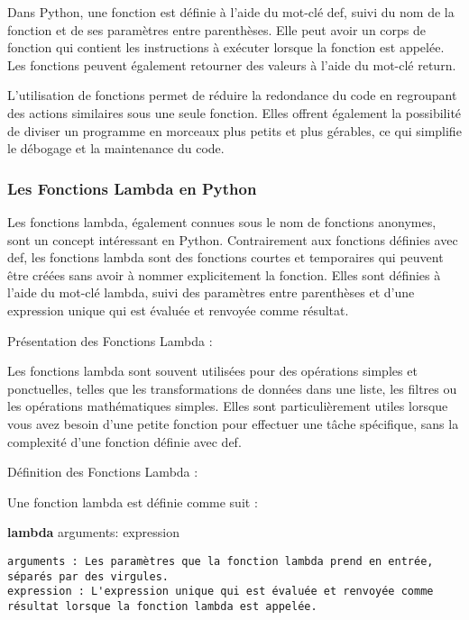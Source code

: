 \documentclass[11pt]{article}
\newenvironment{Shaded}{}{}
\newcommand{\KeywordTok}[1]{\textcolor[rgb]{0.00,0.44,0.13}{\textbf{{#1}}}}
\newcommand{\NormalTok}[1]{{#1}}
\begin{document}
Dans Python, une fonction est définie à l'aide du mot-clé def, suivi du
nom de la fonction et de ses paramètres entre parenthèses. Elle peut
avoir un corps de fonction qui contient les instructions à exécuter
lorsque la fonction est appelée. Les fonctions peuvent également
retourner des valeurs à l'aide du mot-clé return.

L'utilisation de fonctions permet de réduire la redondance du code en
regroupant des actions similaires sous une seule fonction. Elles offrent
également la possibilité de diviser un programme en morceaux plus petits
et plus gérables, ce qui simplifie le débogage et la maintenance du
code.

\hypertarget{les-fonctions-lambda-en-python}{%
\subsubsection{Les Fonctions Lambda en
Python}\label{les-fonctions-lambda-en-python}}

Les fonctions lambda, également connues sous le nom de fonctions
anonymes, sont un concept intéressant en Python. Contrairement aux
fonctions définies avec def, les fonctions lambda sont des fonctions
courtes et temporaires qui peuvent être créées sans avoir à nommer
explicitement la fonction. Elles sont définies à l'aide du mot-clé
lambda, suivi des paramètres entre parenthèses et d'une expression
unique qui est évaluée et renvoyée comme résultat.

Présentation des Fonctions Lambda :

Les fonctions lambda sont souvent utilisées pour des opérations simples
et ponctuelles, telles que les transformations de données dans une
liste, les filtres ou les opérations mathématiques simples. Elles sont
particulièrement utiles lorsque vous avez besoin d'une petite fonction
pour effectuer une tâche spécifique, sans la complexité d'une fonction
définie avec def.

Définition des Fonctions Lambda :

Une fonction lambda est définie comme suit :

\begin{Shaded}
\begin{Highlighting}[]
\KeywordTok{lambda}\NormalTok{ arguments: expression}
\end{Highlighting}
\end{Shaded}

\begin{verbatim}
arguments : Les paramètres que la fonction lambda prend en entrée, séparés par des virgules.
expression : L'expression unique qui est évaluée et renvoyée comme résultat lorsque la fonction lambda est appelée.
\end{verbatim}
\end{document}
